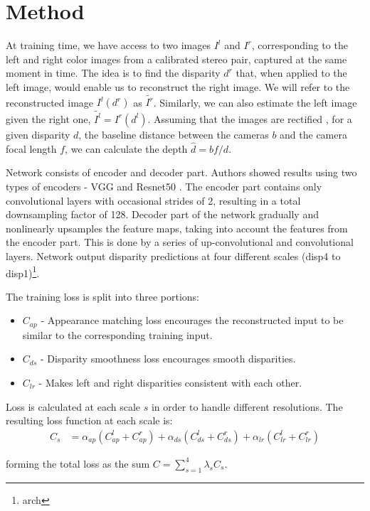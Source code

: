 \documentclass{article}
\begin{document}
\section{Method}
At training time, we have access to two images $I^l$ and $I^r$, corresponding to the left and right color images from a calibrated stereo pair, captured at the same moment in time. The idea is to find the disparity $d^r$ that, when applied to the left image, would enable us to reconstruct the right image. We will refer to the reconstructed image $I^l(d^r)$ as $\tilde{I^r}$. Similarly, we can also estimate the left image given the right one, $\tilde{I^l} = I^r(d^l)$. Assuming that the images are rectified \cite{nesto}, for a given disparity $d$, the baseline distance between the cameras $b$ and the camera focal length $f$, we can calculate the depth $\hat{d}=bf/d$.

Network consists of encoder and decoder part. Authors showed results using two types of encoders - VGG \cite{DBLP:journals/corr/SimonyanZ14a} and Resnet50 \cite{DBLP:journals/corr/HeZRS15}. The encoder part contains only convolutional layers with occasional strides of 2, resulting in a total downsampling factor of 128. Decoder part of the network gradually and nonlinearly upsamples the feature maps, taking into account the features from the encoder part. This is done by a series of up-convolutional and convolutional layers. Network output disparity predictions at four different scales (disp4 to disp1)\footnote{arch}.

The training loss is split into three portions:
\begin{itemize}
	\item $C_{ap}$ - Appearance matching loss encourages the reconstructed input to be similar to the corresponding training input.
	\item $C_{ds}$ - Disparity smoothness loss encourages smooth disparities.
	\item $C_{lr}$ - Makes left and right disparities consistent with each other.
\end{itemize}

Loss is calculated at each scale $s$ in order to handle different resolutions. The resulting loss function at each scale is:
\begin{align*}
	C_s &= \alpha_{ap}(C_{ap}^{l} + C_{ap}^{r}) + \alpha_{ds}(C_{ds}^{l} + C_{ds}^{r}) +
\alpha_{lr}(C_{lr}^{l} + C_{lr}^{r})
\end{align*}

forming the total loss as the sum  $C = \sum_{s=1}^{4}\lambda_sC_s$.
\end{document}
